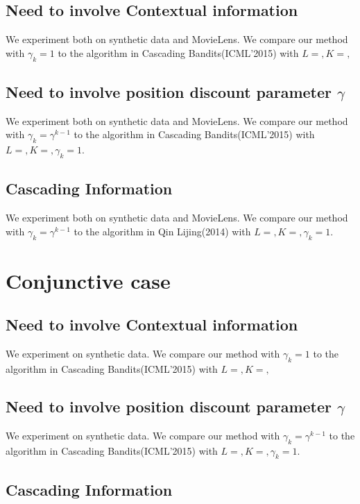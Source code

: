 \documentclass[a4paper,11pt]{article}
\begin{document}
\subsection{Need to involve Contextual information}

We experiment both on synthetic data and MovieLens. We compare our method with $\gamma_k = 1$ to the algorithm in Cascading Bandits(ICML'2015) with $L= , K= ,$

\subsection{Need to involve position discount parameter $\gamma$}

We experiment both on synthetic data and MovieLens. We compare our method with $\gamma_k = \gamma^{k-1}$ to the algorithm in Cascading Bandits(ICML'2015) with $L= , K= , \gamma_k=1$.

\subsection{Cascading Information}

We experiment both on synthetic data and MovieLens. We compare our method with $\gamma_k = \gamma^{k-1}$ to the algorithm in Qin Lijing(2014) with $L= , K= , \gamma_k=1$.


\section{Conjunctive case}

\subsection{Need to involve Contextual information}

We experiment on synthetic data. We compare our method with $\gamma_k = 1$ to the algorithm in Cascading Bandits(ICML'2015) with $L= , K= ,$

\subsection{Need to involve position discount parameter $\gamma$}

We experiment on synthetic data. We compare our method with $\gamma_k = \gamma^{k-1}$ to the algorithm in Cascading Bandits(ICML'2015) with $L= , K= , \gamma_k=1$.

\subsection{Cascading Information}
\end{document}
